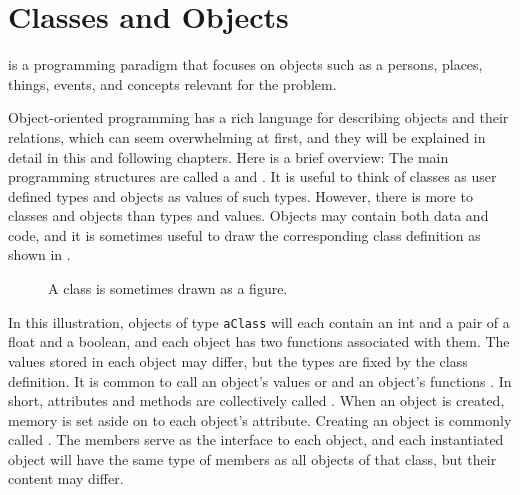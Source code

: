 \chapter{Classes and Objects}
\label{chap:oop}

 is a programming paradigm that focuses on objects such as a persons, places, things, events, and concepts relevant for the problem.

Object-oriented programming has a rich language for describing objects and their relations, which can seem overwhelming at first, and they will be explained in detail in this and following chapters. Here is a brief overview: The main programming structures are called a  and . It is useful to think of classes as user defined types and objects as values of such types. However, there is more to classes and objects than types and values. Objects may contain both data and code, and it is sometimes useful to draw the corresponding class definition as shown in .
\begin{figure}
  \centering
  \caption{A class is sometimes drawn as a figure.}
  \label{fig:aClass}
\end{figure}
In this illustration, objects of type \lstinline{aClass} will each contain an int and a pair of a float and a boolean, and each object has two functions associated with them. The values stored in each object may differ, but the types are fixed by the class definition. It is common to call an object's values  or  and an object's functions . In short, attributes and methods are collectively called . When an object is created, memory is set aside on  to each object's attribute. Creating an object is commonly called . The members serve as the interface to each object, and each instantiated object will have the same type of members as all objects of that class, but their content may differ.


